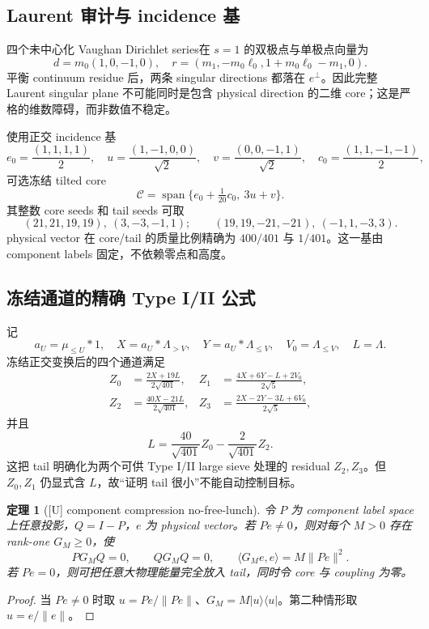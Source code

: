 \documentclass[UTF8,11pt,a4paper]{ctexart}
\newtheorem{theorem}{定理}[section]
\theoremstyle{definition}
\theoremstyle{remark}
\newcommand{\1}{\mathbf 1}
\newcommand{\cC}{\mathcal C}
\newcommand{\statusU}{\textnormal{[U]}}
\begin{document}
\subsection{Laurent 审计与 incidence 基}

四个未中心化 Vaughan Dirichlet series在 $s=1$ 的双极点与单极点向量为
\[
 d=m_0(1,0,-1,0),
\quad
 r=(m_1,-m_0\ell_0,1+m_0\ell_0-m_1,0).
\]
平衡 continuum residue 后，两条 singular directions 都落在 $e^\perp$。因此完整 Laurent singular plane 不可能同时是包含 physical direction 的二维 core；这是严格的维数障碍，而非数值不稳定。

使用正交 incidence 基
\[
 e_0=\frac{(1,1,1,1)}2,\quad
 u=\frac{(1,-1,0,0)}{\sqrt2},\quad
 v=\frac{(0,0,-1,1)}{\sqrt2},\quad
 c_0=\frac{(1,1,-1,-1)}2,
\]
可选冻结 tilted core
\[
 \cC=\operatorname{span}\{e_0+\tfrac1{20}c_0,\ 3u+v\}.
\]
其整数 core seeds 和 tail seeds 可取
\[
 (21,21,19,19),\ (3,-3,-1,1);\qquad
 (19,19,-21,-21),\ (-1,1,-3,3).
\]
physical vector 在 core/tail 的质量比例精确为 $400/401$ 与 $1/401$。这一基由 component labels 固定，不依赖零点和高度。

\subsection{冻结通道的精确 Type I/II 公式}

记
\[
 a_U=\mu_{\leq U}*1,\quad X=a_U*\Lambda_{>V},\quad
 Y=a_U*\Lambda_{\leq V},\quad V_0=\Lambda_{\leq V},\quad L=\Lambda.
\]
冻结正交变换后的四个通道满足
\begin{align*}
 Z_0&=\frac{2X+19L}{2\sqrt{401}},&
 Z_1&=\frac{4X+6Y-L+2V_0}{2\sqrt5},\\
 Z_2&=\frac{40X-21L}{2\sqrt{401}},&
 Z_3&=\frac{2X-2Y-3L+6V_0}{2\sqrt5},
\end{align*}
并且
\[
  L=\frac{40}{\sqrt{401}}Z_0-\frac2{\sqrt{401}}Z_2.
\]
这把 tail 明确化为两个可供 Type I/II large sieve 处理的 residual $Z_2,Z_3$。但 $Z_0,Z_1$ 仍显式含 $L$，故“证明 tail 很小”不能自动控制目标。

\begin{theorem}[\statusU{} component compression no-free-lunch]\label{thm:nofree}
令 $P$ 为 component label space 上任意投影，$Q=I-P$，$e$ 为 physical vector。若 $Pe\neq0$，则对每个 $M>0$ 存在 rank-one $G_M\geq0$，使
\[
  PG_MQ=0,\qquad QG_MQ=0,\qquad
  \langle G_Me,e\rangle=M\|Pe\|^2.
\]
若 $Pe=0$，则可把任意大物理能量完全放入 tail，同时令 core 与 coupling 为零。
\end{theorem}

\begin{proof}
当 $Pe\neq0$ 时取 $u=Pe/\|Pe\|$、$G_M=M|u\rangle\langle u|$。第二种情形取 $u=e/\|e\|$。
\end{proof}
\end{document}
